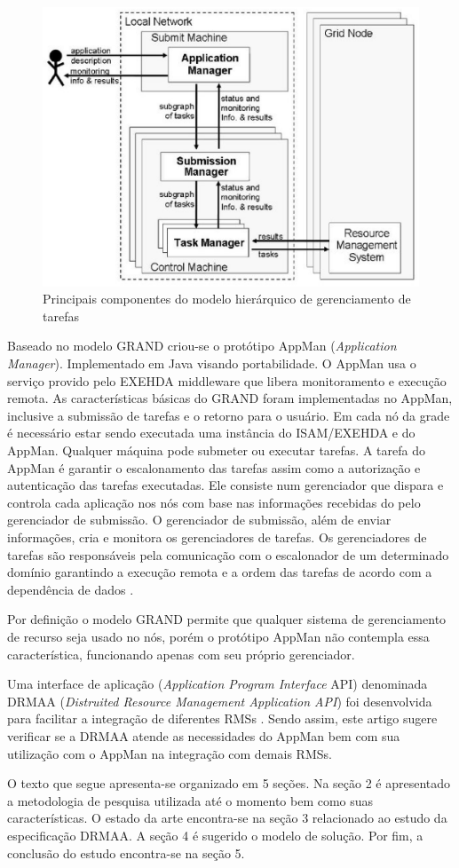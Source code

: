 \begin{figure}[ht]
\centering
\includegraphics[scale=.6]{grand.eps}
\caption{Principais componentes do modelo hierárquico de gerenciamento de tarefas}
\end{figure}

Baseado no modelo GRAND criou-se o protótipo AppMan (\emph{Application Manager}). Implementado em Java visando portabilidade. O AppMan usa o serviço provido pelo EXEHDA middleware \cite{Nino2006} que libera monitoramento e execução remota. As características básicas do GRAND foram implementadas no AppMan, inclusive a submissão de tarefas e o retorno para o usuário. Em cada nó da grade é necessário estar sendo executada uma instância do ISAM/EXEHDA e do AppMan. Qualquer máquina pode submeter ou executar tarefas. A tarefa do AppMan é garantir o escalonamento das tarefas assim como a autorização e autenticação das tarefas executadas. Ele consiste num gerenciador que dispara e controla cada aplicação nos nós com base nas informações recebidas do pelo gerenciador de submissão. O gerenciador de submissão, além de enviar informações, cria e monitora os gerenciadores de tarefas. Os gerenciadores de tarefas são responsáveis pela comunicação com o escalonador de um determinado domínio garantindo a execução remota e a ordem das tarefas de acordo com a dependência de dados \cite{Mangan2006}.

Por definição o modelo GRAND permite que qualquer sistema de gerenciamento de recurso seja usado no nós, porém o protótipo AppMan não contempla essa característica, funcionando apenas com seu próprio gerenciador.

Uma interface de aplicação (\emph{Application Program Interface} API) denominada DRMAA (\emph{Distruited Resource Management Application API}) foi desenvolvida para facilitar a integração de diferentes RMSs \cite{Rajic2004}. Sendo assim, este artigo sugere verificar se a DRMAA atende as necessidades do AppMan bem com sua utilização com o AppMan na integração com demais RMSs.

O texto que segue apresenta-se organizado em 5 seções. Na seção 2 é apresentado a metodologia de pesquisa utilizada até o momento bem como suas características. O estado da arte encontra-se na seção 3 relacionado ao estudo da especificação DRMAA. A seção 4 é sugerido o modelo de solução. Por fim, a conclusão do estudo encontra-se na seção 5.
